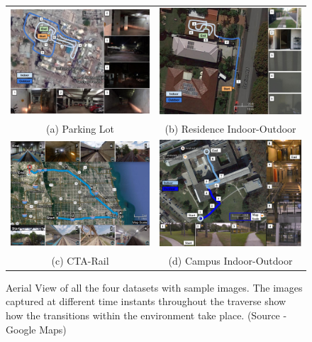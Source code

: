 \documentclass[letterpaper, 10 pt, conference]{ieeeconf}  %
\begin{document}
\begin{figure}[htbp]
\centering
\begin{tabular*}{\textwidth}{cc}
 \includegraphics[width=7cm,height=4cm]{Parking_Amrapali-Map-Images} &
 \hspace{2cm}
 \includegraphics[width=7cm,height=4cm]{Residence-IO-Map-Images} \\
 (a) Parking Lot & (b) Residence Indoor-Outdoor \\
 \includegraphics[width=7cm,height=4cm]{cta-datasetTrajSampleImages} &
 \hspace{2cm}
 \includegraphics[width=7cm,height=4cm]{campus-datasetTrajSampleImages} \\
 (c) CTA-Rail & (d) Campus Indoor-Outdoor \\
\end{tabular*}
 \caption{Aerial View of all the four datasets with sample images. The images captured at different time instants throughout the traverse show how the transitions within the environment take place. (Source - Google Maps)}
 \label{fig:datasetAerialTraj}
\end{figure}
\end{document}
